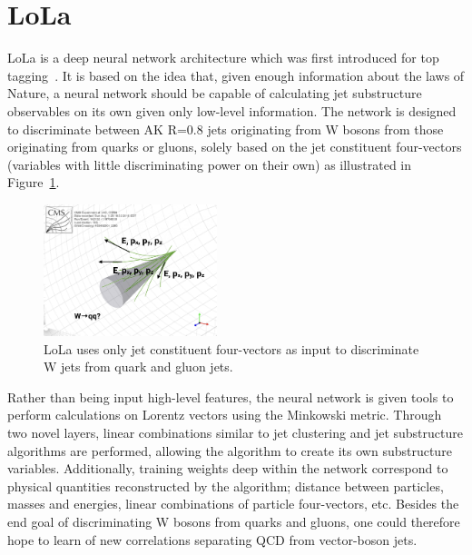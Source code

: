 \section{LoLa}
LoLa is a deep neural network architecture which was first introduced for top tagging~\cite{Butter:2017cot}. It is based on the idea that, given enough information about the laws of Nature, a neural network should be capable of calculating jet substructure observables on its own given only low-level information. The network is designed to discriminate between AK R=0.8 jets originating from W bosons from those originating from quarks or gluons, solely based on the jet constituent four-vectors (variables with little discriminating power on their own) as illustrated in Figure~\ref{fig:lola:4vec}.
\begin{figure}[h!]
\centering
\includegraphics[width=0.45\textwidth]{figures/vtagging/misc/4vec.png}
\caption{LoLa uses only jet constituent four-vectors as input to discriminate W jets from quark and gluon jets.}
\label{fig:lola:4vec}
\end{figure}
Rather than being input high-level features, the neural network is given tools to perform calculations on Lorentz vectors using the Minkowski metric. Through two novel layers, linear combinations similar to jet clustering and jet substructure algorithms are performed, allowing the algorithm to create its own substructure variables. Additionally, training weights deep within the network correspond to physical quantities reconstructed by the algorithm; distance between particles, masses and energies, linear combinations of particle four-vectors, etc.
Besides the end goal of discriminating W bosons from quarks and gluons, one could therefore hope to learn of new correlations separating QCD from vector-boson jets.

